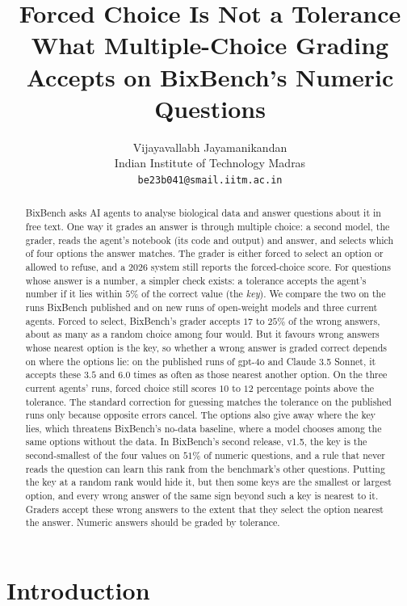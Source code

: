 \documentclass{article}
\title{Forced Choice Is Not a Tolerance\protect\\What Multiple-Choice Grading Accepts on BixBench's Numeric Questions}
\author{%
  Vijayavallabh Jayamanikandan\\
  Indian Institute of Technology Madras\\
  \texttt{be23b041@smail.iitm.ac.in}
}
\begin{document}
\maketitle

\begin{abstract}
BixBench asks AI agents to analyse biological data and answer questions about it in free text. One way it grades an
answer is through multiple choice: a second model, the grader, reads the agent's notebook (its code and output) and
answer, and selects which of four options the answer matches. The grader is either forced to select an option or
allowed to refuse, and a 2026 system still reports the forced-choice score. For questions whose answer is a number, a
simpler check exists: a tolerance accepts the agent's number if it lies within $5\%$ of the correct value (the
\emph{key}). We compare the two on the runs BixBench published and on new runs of open-weight models and three current
agents. Forced to select, BixBench's grader accepts $17$ to $25\%$ of the wrong answers, about as many as a random
choice among four would. But it favours wrong answers whose nearest option is the key, so whether a wrong answer is
graded correct depends on where the options lie: on the published runs of gpt-4o and Claude 3.5 Sonnet, it accepts
these $3.5$ and $6.0$ times as often as those nearest another option. On the three current agents' runs, forced
choice still scores $10$ to $12$ percentage points above the tolerance. The standard correction for guessing matches
the tolerance on the published runs only because opposite errors cancel. The options also give away where the key
lies, which threatens BixBench's no-data baseline, where a model chooses among the same options without the data. In
BixBench's second release, v1.5, the key is the second-smallest of the four values on $51\%$ of numeric questions,
and a rule that never reads the question can learn this rank from the benchmark's other questions. Putting the key at
a random rank would hide it, but then some keys are the smallest or largest option, and every wrong answer of the same
sign beyond such a key is nearest to it. Graders accept these wrong answers to the extent that they select the option
nearest the answer. Numeric answers should be graded by tolerance.
\end{abstract}

\section{Introduction}
\label{sec:intro}
\end{document}

